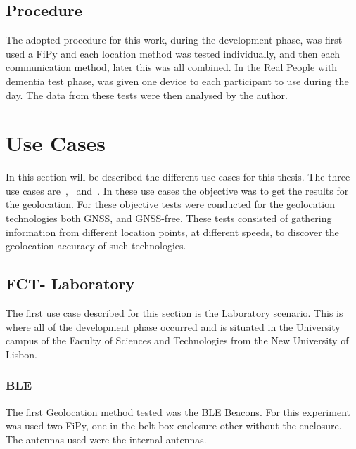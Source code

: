 
\subsection{Procedure}
\label{subsec:Procedure}
The adopted procedure for this work, during the development phase, was first used a FiPy and each location method was tested individually, and then each communication method, later this was all combined. In the Real People with dementia test phase, was given one device to each participant to use during the day. The data from these tests were then analysed by the author.

\section{Use Cases}

In this section will be described the different use cases for this thesis. The three  use cases are~,~ and~. In these use cases the objective was to get the results for the geolocation. 
For these objective  tests were conducted for the geolocation technologies both GNSS, and GNSS-free. These tests consisted of gathering information from different location points, at different speeds, to discover the geolocation accuracy of such technologies. 


\newpage

\subsection{FCT- Laboratory}
\label{subsec:laboratory}
The first use case described for this section is the Laboratory scenario. This is where all of the development phase occurred and is situated in the University campus of the Faculty of Sciences and Technologies from the New University of Lisbon.


\subsubsection{BLE}
\label{subsubsec:Geo_BLE}
The first  Geolocation method tested was the BLE Beacons. For this experiment was used two FiPy, one in the belt box enclosure other without the enclosure. The antennas used were the internal antennas. 

